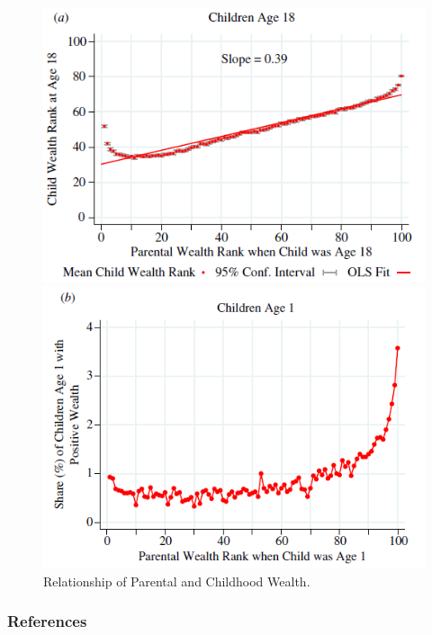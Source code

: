\documentclass[xolor = dvipsnames, compress]{beamer} %
\begin{document}
\begin{frame}[label = boserup]{\citet{boserup_born_2018}}    
\begin{figure}[ht]
        \begin{minipage}[b]{0.45\linewidth}
            \centering
            \includegraphics[width=\textwidth]{Boserup_a.png}
        \end{minipage}
        \hspace{0.2cm}
        \begin{minipage}[b]{0.45\linewidth}
            \centering
            \includegraphics[width=\textwidth]{Boserup_b.png}
        \end{minipage}
		\caption{\scriptsize{Relationship of Parental and Childhood Wealth.}}
    \end{figure}
\end{frame}



\begin{frame}[allowframebreaks]
\frametitle{References}
\printbibliography
\end{frame}

\end{document}
